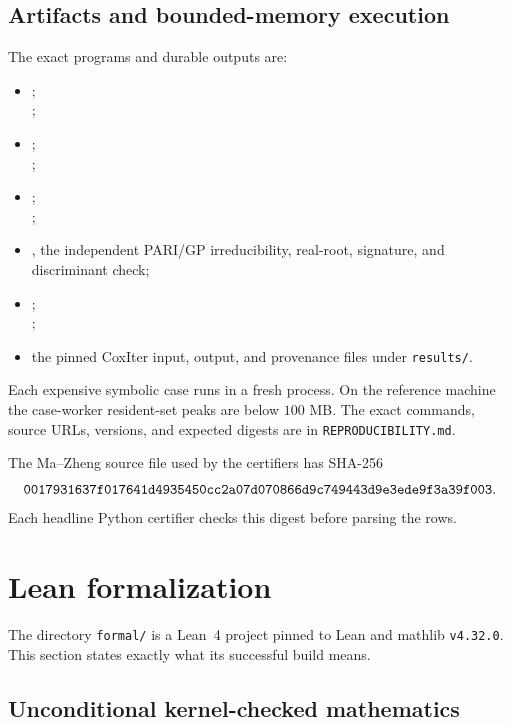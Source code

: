 \documentclass[11pt]{article}
\numberwithin{equation}{section}
\theoremstyle{definition}
\theoremstyle{remark}
\newcommand{\code}[1]{\texttt{#1}}
\begin{document}
\subsection{Artifacts and bounded-memory execution}

The exact programs and durable outputs are:
\begin{itemize}[leftmargin=2em]
\item {};\\
  ;
\item {};\\
  ;
\item {};\\
  ;
\item {}, the independent PARI/GP
  irreducibility, real-root, signature, and discriminant check;
\item {};\\
  ;
\item the pinned CoxIter input, output, and provenance files under
  \code{results/}.
\end{itemize}
Each expensive symbolic case runs in a fresh process.  On the reference
machine the case-worker resident-set peaks are below \(100\) MB.  The exact
commands, source URLs, versions, and expected digests are in
\code{REPRODUCIBILITY.md}.

The Ma--Zheng source file used by the certifiers has SHA-256
\[
\text{\code{0017931637f017641d4935450cc2a07d070866d9c749443d9e3ede9f3a39f003}}.
\]
Each headline Python certifier checks this digest before parsing the rows.

\section{Lean formalization}
\label{sec:lean}

The directory \code{formal/} is a Lean~4 project pinned to Lean and mathlib
\code{v4.32.0}.  This section states exactly what its successful build means.

\subsection{Unconditional kernel-checked mathematics}
\end{document}
